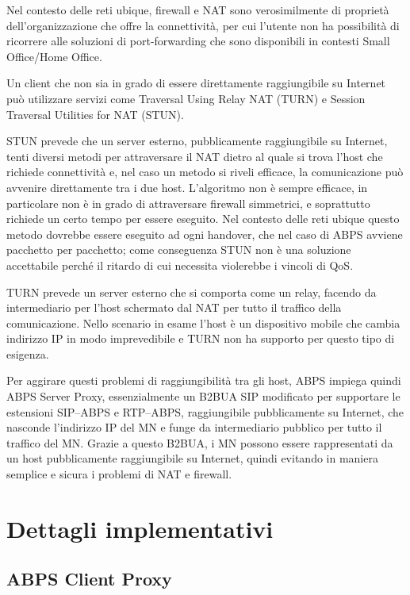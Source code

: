 \documentclass[12pt,a4paper,openright,twoside]{book}
\begin{document}
Nel contesto delle reti ubique, firewall e NAT sono verosimilmente di
proprietà dell'organizzazione che offre la connettività, per cui
l'utente non ha possibilità di ricorrere alle soluzioni di
port-forwarding che sono disponibili in contesti Small Office/Home
Office.

Un client che non sia in grado di essere direttamente raggiungibile su
Internet può utilizzare servizi come Traversal Using Relay NAT (TURN)
e Session Traversal Utilities for NAT (STUN).

STUN prevede che un server esterno, pubblicamente raggiungibile su
Internet, tenti diversi metodi per attraversare il NAT dietro al quale
si trova l'host che richiede connettività e, nel caso un metodo si
riveli efficace, la comunicazione può avvenire direttamente tra i due
host. L'algoritmo non è sempre efficace, in particolare non è in grado
di attraversare firewall simmetrici, e soprattutto richiede un certo
tempo per essere eseguito. Nel contesto delle reti ubique questo
metodo dovrebbe essere eseguito ad ogni handover, che nel caso di ABPS
avviene pacchetto per pacchetto; come conseguenza STUN non è una
soluzione accettabile perché il ritardo di cui necessita violerebbe i
vincoli di QoS.

TURN prevede un server esterno che si comporta come un relay, facendo
da intermediario per l'host schermato dal NAT per tutto il traffico
della comunicazione. Nello scenario in esame l'host è un dispositivo
mobile che cambia indirizzo IP in modo imprevedibile e TURN non ha
supporto per questo tipo di esigenza.

Per aggirare questi problemi di raggiungibilità tra gli host, ABPS
impiega quindi ABPS Server Proxy, essenzialmente un B2BUA SIP
modificato per supportare le estensioni SIP--ABPS e RTP--ABPS,
raggiungibile pubblicamente su Internet, che nasconde l'indirizzo IP
del MN e funge da intermediario pubblico per tutto il traffico del
MN. Grazie a questo B2BUA, i MN possono essere rappresentati da un
host pubblicamente raggiungibile su Internet, quindi evitando in
maniera semplice e sicura i problemi di NAT e firewall.

\section{Dettagli implementativi}

\subsection{ABPS Client Proxy}
\end{document}
